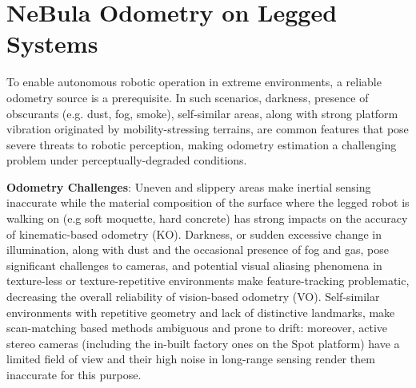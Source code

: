 \documentclass[letterpaper, 10pt, conference]{ieeeconf}      %
\newcommand{\ph}[1]{{\textbf{#1}:}} %
\newcommand{\rev}[1]{{\color{blue} #1 }} %
\begin{document}









\vspace{20}

\section{NeBula Odometry on Legged Systems}\label{sec:state_estimation}



\rev{To enable autonomous robotic operation in extreme environments, a reliable odometry source is a prerequisite. In such scenarios, darkness, presence of obscurants (e.g. dust, fog, smoke), self-similar areas, along with strong platform vibration originated by mobility-stressing terrains, are common features that pose severe threats to robotic perception, making odometry estimation a challenging problem under perceptually-degraded conditions.}



\ph {Odometry Challenges} 
Uneven and slippery areas make inertial sensing inaccurate while the material composition of the surface where the legged robot is walking on (e.g soft moquette, hard concrete) has strong impacts on the accuracy of kinematic-based odometry (KO). Darkness, or sudden excessive change in illumination, along with dust and the occasional presence of fog and gas, pose significant challenges to cameras, and potential visual aliasing phenomena in texture-less or texture-repetitive environments make feature-tracking problematic, decreasing the overall reliability of vision-based odometry (VO). Self-similar environments with repetitive geometry and lack of distinctive landmarks, make scan-matching based methods ambiguous and prone to drift: moreover, active stereo cameras (including the in-built factory ones on the Spot platform) have a limited field of view and their high noise in long-range sensing render them inaccurate for this purpose.
\end{document}
